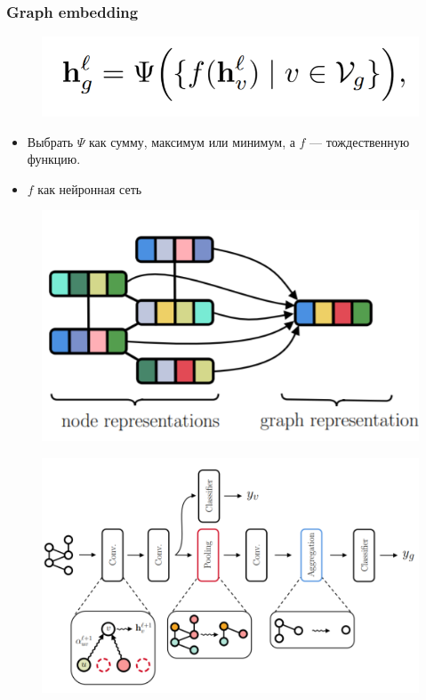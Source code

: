 \documentclass{beamer}
\begin{document}
\begin{frame}
\frametitle{Graph embedding}
\begin{multicols}{2}
\begin{figure}
	\includegraphics[width=\columnwidth]{graph_classification.png}
\end{figure}
\begin{itemize}
	\item Выбрать $\Psi$ как сумму, максимум или минимум, а $f$ --- тождественную функцию.
	\item $f$ как нейронная сеть
\end{itemize}
\columnbreak
\begin{figure}
	\includegraphics[width=\columnwidth]{graph_aggregation.png}
\end{figure}
	
\end{multicols}
\end{frame}

\begin{frame}
	\begin{figure}
		\includegraphics[width=\columnwidth]{network.png}
	\end{figure}
\end{frame}
\end{document}
